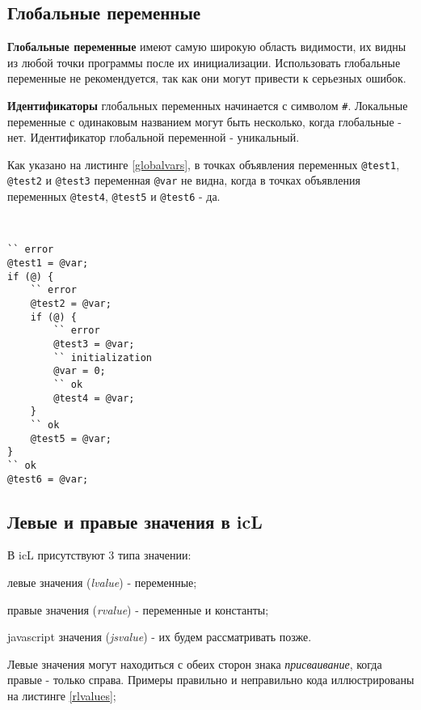 \subsection{Глобальные переменные}

\textbf{Глобальные переменные} имеют самую широкую область видимости, их видны из любой точки программы после их инициализации. Использовать глобальные переменные не рекомендуется, так как они могут привести к серьезных ошибок.

{\bf Идентификаторы} глобальных переменных начинается с символом {\color{blue2}\texttt{#}}. Локальные переменные с одинаковым названием могут быть несколько, когда глобальные - нет. Идентификатор глобальной переменной - уникальный.

Как указано на листинге \ref{globalvars}, в точках объявления переменных \texttt{@test1}, \texttt{@test2} и \texttt{@test3} переменная \texttt{@var} не видна, когда в точках объявления переменных \texttt{@test4}, \texttt{@test5} и \texttt{@test6} - да.

\

\begin{sourcecode}
\label{globalvars}
\begin{verbatim}
`` error
@test1 = @var;
if (@) {
	`` error
	@test2 = @var;
	if (@) {
		`` error
		@test3 = @var;
		`` initialization
		@var = 0;
		`` ok
		@test4 = @var;
	}
	`` ok
	@test5 = @var;
}
`` ok
@test6 = @var;
\end{verbatim}
\end{sourcecode}

\subsection{Левые и правые значения в icL}

В icL присутствуют 3 типа значении:

\begin{icEnum}
\item
	левые значения ({\it lvalue}) - переменные;
\item
	правые значения ({\it rvalue}) - переменные и константы;
\item
	javascript значения ({\it jsvalue}) - их будем рассматривать позже.
\end{icEnum}

Левые значения могут находиться с обеих сторон знака {\it присваивание}, когда правые - только справа. Примеры правильно и неправильно кода иллюстрированы на листинге \ref{rlvalues};

